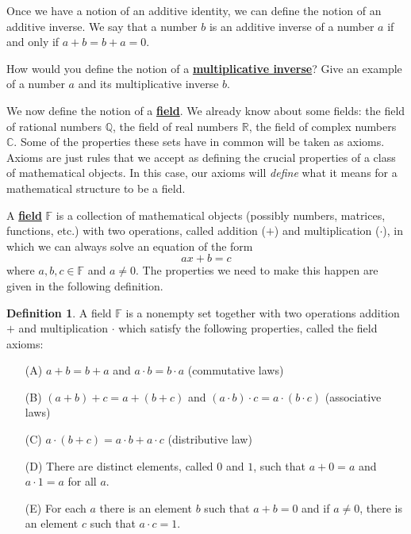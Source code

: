 \documentclass[11pt]{article}
\newenvironment{task}
	{\begin{mdframed}[linecolor=lightgray, linewidth=3pt]\raggedright}
	{\end{mdframed}}
\renewcommand\emph[1]{\underline{\bf{#1}}} %
\theoremstyle{definition}
\newtheorem{definition}[theorem]{Definition}
\begin{document}
Once we have a notion of an additive identity, we can define the notion of an additive inverse. We say that 
a number $b$ is an additive inverse of a number $a$ if and only if $a+b=b+a = 0$. 

\begin{task}
  How would you define the notion of a \emph{multiplicative inverse}? Give an example of a number $a$ and its 
  multiplicative inverse $b$.
\end{task}

We now define the notion of a \emph{field}. We already know about some fields: the field of rational numbers $\mathbb{Q}$, the field of real numbers $\mathbb{R}$, the
field of complex numbers $\mathbb{C}$. Some of the properties these sets have in common will be taken as axioms. Axioms are just rules that we accept as defining
the crucial properties of a class of mathematical objects. In this case, our axioms will \textit{define} what it means for a mathematical structure to be a field.

A \emph{field} $\mathbb{F}$ is a collection of mathematical objects (possibly numbers, matrices, functions, etc.) with two operations, called
addition ($+$) and multiplication ($\cdot$), in which we can always solve an equation of the form
\[ ax + b = c\]
where $a,b,c\in\mathbb{F}$ and $a \neq 0$. The properties we need to make this happen are given in the following definition.

\begin{definition} A field $\mathbb{F}$ is a nonempty set together with two operations addition $+$ and multiplication $\cdot$ which satisfy the following
  properties, called the field axioms:
  \begin{enumerate}
    \item[(A)] $a+b=b+a$ and $a\cdot b=b\cdot a$ (commutative laws)
    \item[(B)] $(a+b)+c = a + (b+c)$ and $(a\cdot b)\cdot c = a\cdot (b \cdot c)$ (associative laws)
    \item[(C)] $a\cdot (b+c) = a\cdot b + a \cdot c$ (distributive law)
    \item[(D)] There are distinct elements, called $0$ and $1$, such that $a+0 = a $ and $a \cdot 1 = a$ for all $a$.
    \item[(E)] For each $a$ there is an element $b$ such that $a + b = 0$ and if $a\neq 0$, there is an element $c$ such that $a\cdot c = 1$.
  \end{enumerate}
\end{definition}
\end{document}
